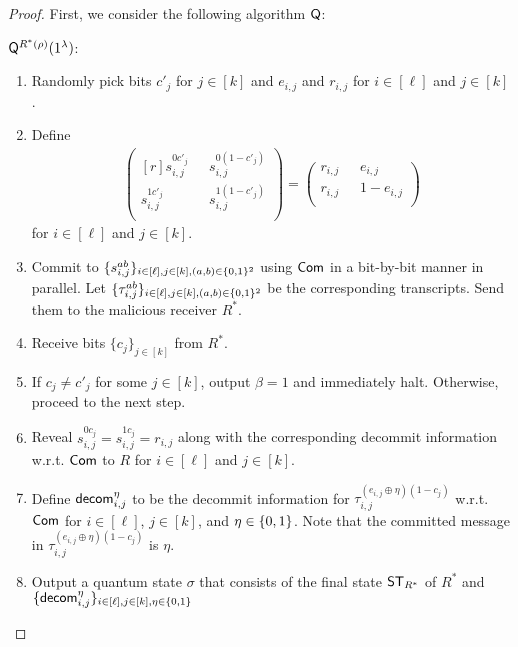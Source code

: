 \begin{proof}
First, we consider the following algorithm $\mathsf{Q}$:

\smallskip
\noindent
$\mathsf{Q}^{R^*(\rho)}(1^\lambda)$:  
\begin{enumerate}
\item Randomly pick bits $c'_j$ for $j\in[k]$ and $e_{i,j}$ and $r_{i,j}$  for $i\in[\ell]$ and $j\in [k]$.
\item 
Define
\begin{align*}
\begin{pmatrix*}[r]
s^{0c'_j}_{i,j} & ~~~s^{0(1-c'_j)}_{i,j} \\
s^{1c'_j}_{i,j} & ~~~s^{1(1-c'_j)}_{i,j} \\
\end{pmatrix*}
=
\begin{pmatrix}
r_{i,j} & ~~~e_{i,j} \\
r_{i,j} & ~~~1-e_{i,j} \\
\end{pmatrix}
\end{align*}
for 
$i\in [\ell]$ and $j\in [k]$. 
\item 
Commit to $\{s_{i,j}^{ab}\}_{i\in [\ell],j\in[k],(a,b)\in\{0,1\}^2}$ using $\mathsf{Com}$ in a bit-by-bit manner in parallel.  
Let $\{\tau_{i,j}^{ab}\}_{i\in [\ell],j\in[k],(a,b)\in\{0,1\}^2}$ be the corresponding transcripts. 
Send them to the malicious receiver $R^*$. 
 \item Receive bits $\{c_j\}_{j\in [k]}$ from $R^*$.  
 \item If $c_j\ne c'_j$ for some $j\in[k]$, output $\beta=1$ and immediately halt. 
 Otherwise, proceed to the next step. 
 \item Reveal $s_{i,j}^{0c_j}=s_{i,j}^{1c_j}=r_{i,j}$ along with the corresponding decommit information w.r.t. $\mathsf{Com}$ to $R$ for $i\in [\ell]$ and $j\in [k]$. 
 \item Define $\mathsf{decom}_{i,j}^{\eta}$ to be the decommit information for $\tau_{i,j}^{(e_{i,j}\oplus \eta)(1-c_j)}$ w.r.t. $\mathsf{Com}$ for $i\in [\ell]$, $j\in [k]$, and $\eta\in\{0,1\}$.  Note that the committed message in $\tau_{i,j}^{(e_{i,j}\oplus \eta)(1-c_j)}$ is $\eta$. 
 \item Output a quantum state $\sigma$ that consists of the final state $\mathsf{ST}_{R^*}$ of $R^*$ and $\{\mathsf{decom}_{i,j}^{\eta}\}_{i\in[\ell],j\in[k],\eta\in\{0,1\}}$ 

\end{enumerate}
\end{proof}
